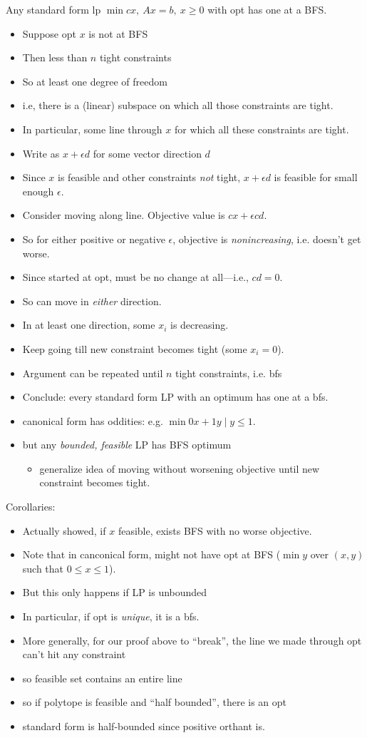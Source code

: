 \documentclass{article}
\begin{document}
Any standard form lp $\min cx,\ Ax=b,\ x\ge 0$ with opt has one at a BFS.
\begin{itemize}
\item Suppose opt $x$ is not at BFS
\item Then less than $n$ tight constraints
\item So at least one degree of freedom
\item i.e, there is a (linear) subspace on which all those constraints
are tight.
\item In particular, some line through $x$ for which all these
constraints are tight.
\item Write as $x+\epsilon d$ for some vector direction $d$
\item Since $x$ is feasible and other constraints \emph{not} tight,
$x+\epsilon d$ is feasible for small enough $\epsilon$.
\item Consider moving along line.  Objective value is $cx+\epsilon cd$.
\item So for either positive or negative $\epsilon$, objective is
\emph{nonincreasing}, i.e. doesn't get worse.
\item Since started at opt, must be no change at all---i.e., $cd=0$.
\item So can move in \emph{either} direction.
\item In at least one direction, some $x_i$ is decreasing.
\item Keep going till new constraint becomes tight (some $x_i=0$).
\item Argument can be repeated until $n$ tight constraints, i.e. bfs
\item Conclude: every standard form LP with an optimum has one at a
  bfs.
\item canonical form has oddities: e.g. $\min 0x+1y \mid y \le 1$.
\item but any \emph{bounded, feasible} LP has BFS optimum
\begin{itemize}
\item generalize idea of moving without worsening objective until new
  constraint becomes tight.
\end{itemize}
\end{itemize}


Corollaries:
\begin{itemize}
\item Actually showed, if $x$ feasible, exists BFS with no worse objective.
\item Note that in canconical form, might not have opt at BFS
  ($\min y$ over $(x,y)$ such that $0 \le x \le 1$).
\item But this only happens if LP is unbounded
\item In particular, if opt is \emph{unique}, it is a bfs.
\item More generally, for our proof above to ``break'', the line
we made through opt can't hit any constraint
\item so feasible set contains an entire line
\item so if polytope is feasible and ``half bounded'', there is an opt
\item standard form is half-bounded since positive orthant is.
\end{itemize}
\end{document}

